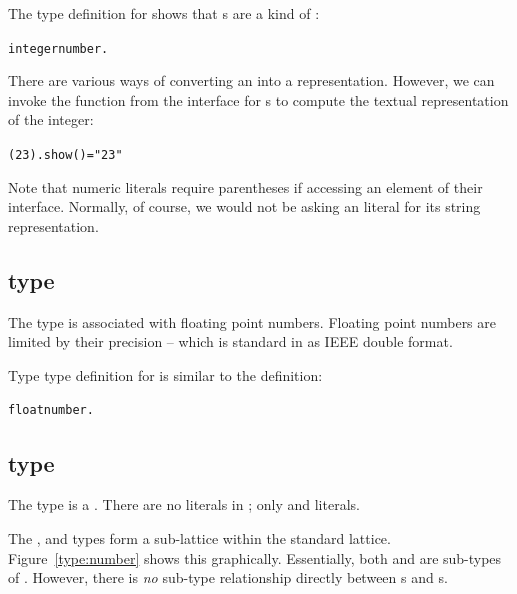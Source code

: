 The type definition for  shows that s are a kind of :
\begin{alltt}
integer \impl number.
\end{alltt}

There are various ways of converting an  into a  representation. However, we can invoke the  function from the interface for s to compute the textual representation of the integer:
\begin{alltt}
(23).show() = "23"
\end{alltt}
\begin{aside}
Note that numeric literals require parentheses if accessing an element of their interface. Normally, of course, we would not be asking an  literal for its string representation.
\end{aside}


\subsection{ type}
\label{types: float}

The  type is associated with floating point numbers. Floating point numbers are limited by their precision -- which is standard in \go as IEEE double format.

Type type definition for  is similar to the  definition:
\begin{alltt}
float \impl number.
\end{alltt}

\subsection{ type}
\label{types:number}

The  type is a . There are no  literals in \go; only  and  literals.

The ,  and  types form a sub-lattice within the standard lattice. Figure~\vref{type:number} shows this graphically. Essentially, both  and  are sub-types of . However, there is \emph{no} sub-type relationship directly between s and s.

